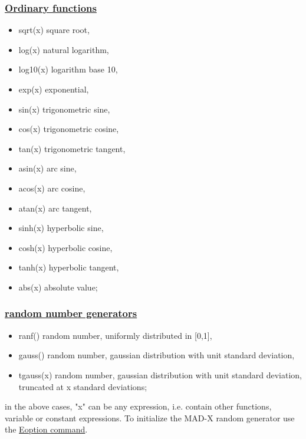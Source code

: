 \subsubsection{\href{function}{Ordinary functions}}
\begin{itemize}
	\item sqrt(x) square root, 
	\item log(x) natural logarithm, 
	\item log10(x) logarithm base 10, 
	\item exp(x) exponential, 
	\item sin(x) trigonometric sine, 
	\item cos(x) trigonometric cosine, 
	\item tan(x) trigonometric tangent, 
	\item asin(x) arc sine, 
	\item acos(x) arc cosine, 
	\item atan(x) arc tangent, 
	\item sinh(x) hyperbolic sine, 
	\item cosh(x) hyperbolic cosine, 
	\item tanh(x) hyperbolic tangent, 
	\item abs(x) absolute value; 
\end{itemize}

\subsubsection{\href{random}{random number generators}}
\begin{itemize}
	\item ranf() random number, uniformly distributed in [0,1], 
	\item gauss() random number, gaussian distribution with unit standard deviation, 
	\item tgauss(x) random number, gaussian distribution with unit standard deviation, truncated at x standard deviations; 
\end{itemize} in the above cases, "x" can be any expression, i.e. contain other functions, variable or constant expressions. To initialize the MAD-X random generator use the \href{../error/error_option.html#EOPTION}{Eoption command}. 

